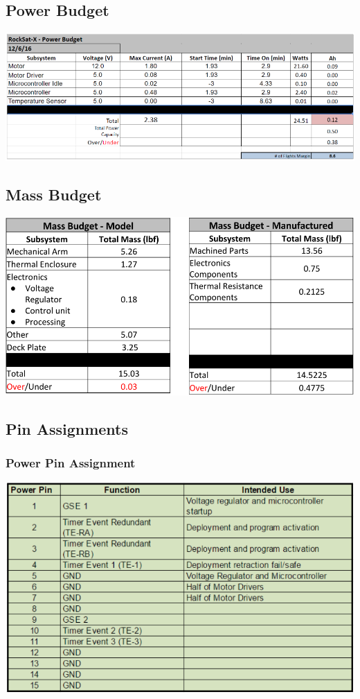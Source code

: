 \subsection{Power Budget}
\includegraphics[width=\textwidth]{./images/OtherDocs/powerBudget}

\subsection{Mass Budget}
\includegraphics[width=\textwidth]{./images/OtherDocs/massBudget}

\subsection{Pin Assignments}
\subsubsection{Power Pin Assignment}
\includegraphics[width=\textwidth]{./images/OtherDocs/powerPinAssignments}

